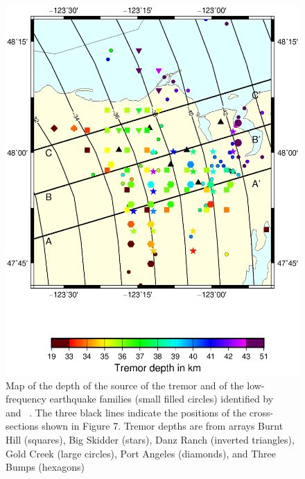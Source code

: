 \documentclass[draft]{agujournal2019}
\begin{document}
\begin{figure}
\noindent\includegraphics[width=\textwidth, trim={1cm 5cm 3.5cm 4cm},clip]{figures/depth_PWS_PWS.eps}
\caption{Map of the depth of the source of the tremor and of the low-frequency earthquake families (small filled circles) identified by ~ and ~. The three black lines indicate the positions of the cross-sections shown in Figure 7. Tremor depths are from arrays Burnt Hill (squares), Big Skidder (stars), Danz Ranch (inverted triangles),  Gold Creek (large circles), Port Angeles (diamonds), and Three Bumps (hexagons)}
\label{pngfiguresample}
\end{figure}
\end{document}
